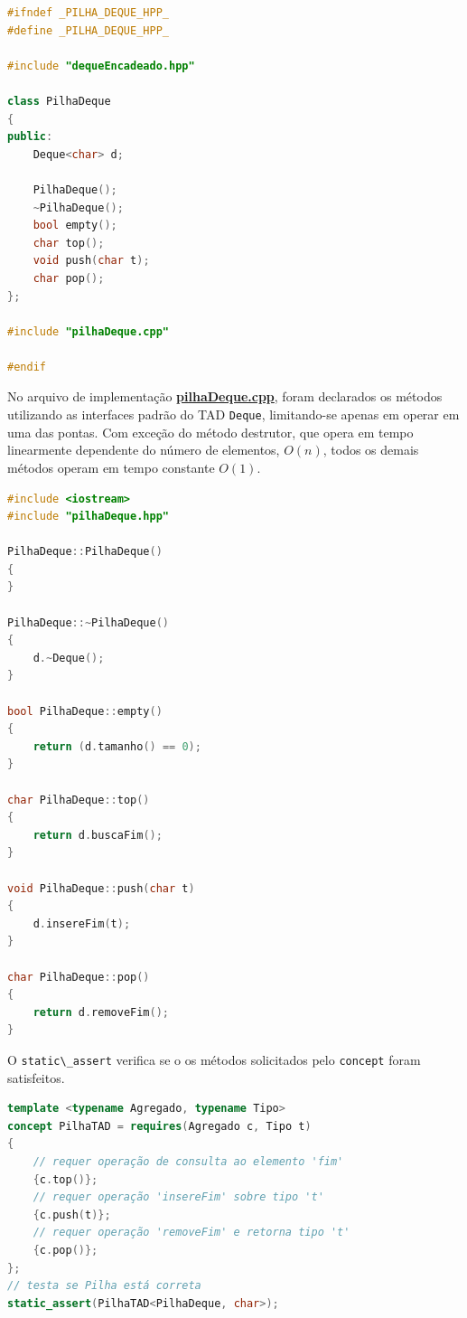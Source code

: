 \documentclass[
  brazilian,
  paper=a4,
  oneside  ,captions=tableheading
]{scrbook}
\newcommand{\passthrough}[1]{#1}
\begin{document}
\begin{lstlisting}[language={C++}]
#ifndef _PILHA_DEQUE_HPP_
#define _PILHA_DEQUE_HPP_

#include "dequeEncadeado.hpp"

class PilhaDeque
{
public:
    Deque<char> d; 

    PilhaDeque();
    ~PilhaDeque();
    bool empty();
    char top();
    void push(char t);
    char pop();
}; 

#include "pilhaDeque.cpp"

#endif
\end{lstlisting}

No arquivo de implementação
\href{https://github.com/ecostadelle/lista_pilhas_filas/blob/main/include/pilhaDeque.cpp}{\textbf{pilhaDeque.cpp}},
foram declarados os métodos utilizando as interfaces padrão do TAD
\passthrough{\lstinline!Deque!}, limitando-se apenas em operar em uma
das pontas. Com exceção do método destrutor, que opera em tempo
linearmente dependente do número de elementos, \(O(n)\), todos os demais
métodos operam em tempo constante \(O(1)\).

\begin{lstlisting}[language={C++}]
#include <iostream>
#include "pilhaDeque.hpp"

PilhaDeque::PilhaDeque()
{
}

PilhaDeque::~PilhaDeque()
{
    d.~Deque();
}

bool PilhaDeque::empty()
{
    return (d.tamanho() == 0);
}

char PilhaDeque::top()
{
    return d.buscaFim();
}

void PilhaDeque::push(char t)
{
    d.insereFim(t);
}

char PilhaDeque::pop()
{
    return d.removeFim();
}
\end{lstlisting}

O \passthrough{\lstinline!static\_assert!} verifica se o os métodos
solicitados pelo \passthrough{\lstinline!concept!} foram satisfeitos.

\begin{lstlisting}[language={C++}]
template <typename Agregado, typename Tipo>
concept PilhaTAD = requires(Agregado c, Tipo t)
{
    // requer operação de consulta ao elemento 'fim'
    {c.top()};
    // requer operação 'insereFim' sobre tipo 't'
    {c.push(t)};
    // requer operação 'removeFim' e retorna tipo 't'
    {c.pop()};
};
// testa se Pilha está correta
static_assert(PilhaTAD<PilhaDeque, char>);
\end{lstlisting}
\end{document}
